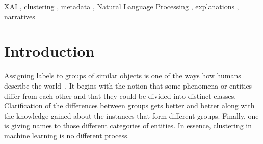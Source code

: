 \documentclass[
 twocolumn,
 hf,
]{ceurart}
\begin{document}
\begin{keywords}
  XAI \sep
  clustering \sep
  metadata \sep
  Natural Language Processing \sep
  explanations \sep
  narratives
\end{keywords}

\maketitle

\section{Introduction}\label{sec:introduction}
Assigning labels to groups of similar objects is one of the ways how humans describe the world~\cite{Rosch1978-ROSCAC-5}.
It begins with the notion that some phenomena or entities differ from each other and that they could be divided into distinct classes.
Clarification of the differences between groups gets better and better along with the knowledge gained about the instances that form different groups.
Finally, one is giving names to those different categories of entities. %
In essence, clustering in machine learning is no different process.
\end{document}
